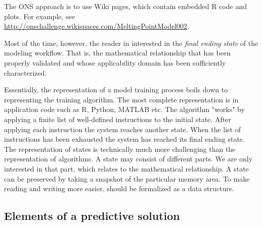 \documentclass[12pt,letterpaper]{article}
\begin{document}
The ONS approach is to use Wiki pages, which contain embedded R code
and plots. For example, see
\url{http://onschallenge.wikispaces.com/MeltingPointModel002}.

Most of the time, however, the reader in interested in the \emph{final
ending state} of the modeling workflow. That is, the mathematical 
relationship that has been properly validated and whose applicability 
domain has been sufficiently characterized.

Essentially, the representation of a model training process boils down
to representing the training algorithm. The most complete representation
is in application code such as R, Python, MATLAB etc.
The algorithm "works" by applying a finite list of well-defined 
instructions to the initial state. After applying each instruction the
system reaches another state. When the list of instructions has been
exhausted the system has reached its final ending state.
The representation of states is technically much more challenging than 
the representation of algorithms. A state may consist of different
parts. We are only interested in that part, which relates to the 
mathematical relationship. A state can be preserved by taking a snapshot
of the particular memory area. To make reading and writing more easier,
should be formalized as a data structure.

\subsection{Elements of a predictive solution}
\end{document}
